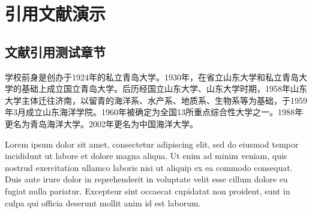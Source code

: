 \chapter{引用文献演示}

\section{文献引用测试章节}

学校前身是创办于1924年的私立青岛大学\cite{knuth86a}。1930年，在省立山东大学和私立青岛大学的基础上成立国立青岛大学。后历经国立山东大学、山东大学时期\cite{knuth84}，1958年山东大学主体迁往济南\cite{lamport94}，以留青的海洋系、水产系、地质系、生物系等为基础，于1959年3月成立山东海洋学院。1960年被确定为全国13所重点综合性大学之一。1988年更名为青岛海洋大学。2002年更名为中国海洋大学。

Lorem ipsum dolor sit amet\cite{slg}, consectetur adipiscing elit, sed do eiusmod tempor incididunt ut labore et dolore magna aliqua\cite{dwx}. Ut enim ad minim veniam, quis nostrud exercitation ullamco laboris nisi ut aliquip ex ea commodo consequat. Duis aute irure dolor in reprehenderit in voluptate velit esse cillum dolore eu fugiat nulla pariatur. Excepteur sint occaecat cupidatat non proident, sunt in culpa qui officia deserunt mollit anim id est laborum.